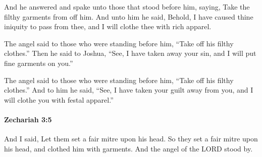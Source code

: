 			\begin{versebox}
					\item[BHS] 
					\item[LXX] 
					\item[ASV] And he answered and spake unto those that stood before him, saying, Take the filthy garments from off him. And unto him he said, Behold, I have caused thine iniquity to pass from thee, and I will clothe thee with rich apparel.
					\item[NIV] The angel said to those who were standing before him, “Take off his filthy clothes.” Then he said to Joshua, “See, I have taken away your sin, and I will put fine garments on you.”
					\item[NRSV] The angel said to those who were standing before him, “Take off his filthy clothes.” And to him he said, “See, I have taken your guilt away from you, and I will clothe you with festal apparel.”
			\end{versebox}

		\paragraph{Zechariah 3:5} %
			\label{ZECHARIAH-3-5}

			And I said, Let them set a fair mitre upon his head. So they set a fair mitre upon his head, and clothed him with garments. And the angel of the LORD stood by.

